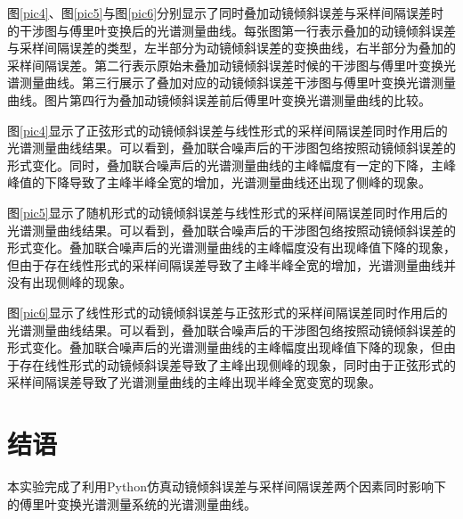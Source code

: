 \documentclass[conference]{IEEEtran}
\begin{document}
图\ref{pic4}、图\ref{pic5}与图\ref{pic6}分别显示了同时叠加动镜倾斜误差与采样间隔误差时的干涉图与傅里叶变换后的光谱测量曲线。每张图第一行表示叠加的动镜倾斜误差与采样间隔误差的类型，左半部分为动镜倾斜误差的变换曲线，右半部分为叠加的采样间隔误差。第二行表示原始未叠加动镜倾斜误差时候的干涉图与傅里叶变换光谱测量曲线。第三行展示了叠加对应的动镜倾斜误差干涉图与傅里叶变换光谱测量曲线。图片第四行为叠加动镜倾斜误差前后傅里叶变换光谱测量曲线的比较。

图\ref{pic4}显示了正弦形式的动镜倾斜误差与线性形式的采样间隔误差同时作用后的光谱测量曲线结果。可以看到，叠加联合噪声后的干涉图包络按照动镜倾斜误差的形式变化。同时，叠加联合噪声后的光谱测量曲线的主峰幅度有一定的下降，主峰峰值的下降导致了主峰半峰全宽的增加，光谱测量曲线还出现了侧峰的现象。

图\ref{pic5}显示了随机形式的动镜倾斜误差与线性形式的采样间隔误差同时作用后的光谱测量曲线结果。可以看到，叠加联合噪声后的干涉图包络按照动镜倾斜误差的形式变化。叠加联合噪声后的光谱测量曲线的主峰幅度没有出现峰值下降的现象，但由于存在线性形式的采样间隔误差导致了主峰半峰全宽的增加，光谱测量曲线并没有出现侧峰的现象。

图\ref{pic6}显示了线性形式的动镜倾斜误差与正弦形式的采样间隔误差同时作用后的光谱测量曲线结果。可以看到，叠加联合噪声后的干涉图包络按照动镜倾斜误差的形式变化。叠加联合噪声后的光谱测量曲线的主峰幅度出现峰值下降的现象，但由于存在线性形式的动镜倾斜误差导致了主峰出现侧峰的现象，同时由于正弦形式的采样间隔误差导致了光谱测量曲线的主峰出现半峰全宽变宽的现象。

\section{结语}
本实验完成了利用Python仿真动镜倾斜误差与采样间隔误差两个因素同时影响下的傅里叶变换光谱测量系统的光谱测量曲线。
\end{document}
